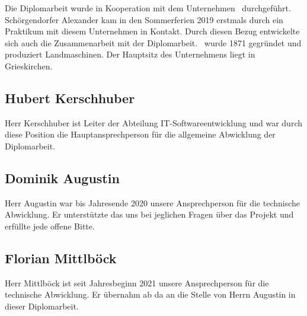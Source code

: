 Die Diplomarbeit wurde in Kooperation mit dem Unternehmen \ThPartnerName \, durchgeführt. Schörgendorfer Alexander kam in den Sommerferien 2019 erstmals durch ein Praktikum mit diesem Unternehmen in Kontakt. Durch diesen Bezug entwickelte sich auch die Zusammenarbeit mit der Diplomarbeit. \ThPartnerName \, wurde 1871 gegründet und produziert Landmaschinen. Der Hauptsitz des Unternehmens liegt in Grieskirchen.

\subsection{Hubert Kerschhuber}

Herr Kerschhuber ist Leiter der Abteilung IT-Softwareentwicklung und war durch diese Position die Hauptansprechperson für die allgemeine Abwicklung der Diplomarbeit.

\subsection{Dominik Augustin}

Herr Augustin war bis Jahresende 2020 unsere Ansprechperson für die technische Abwicklung. Er unterstützte das uns bei jeglichen Fragen über das Projekt und erfüllte jede offene Bitte.

\subsection{Florian Mittlböck}

Herr Mittlböck ist seit Jahresbeginn 2021 unsere Ansprechperson für die technische Abwicklung. Er übernahm ab da an die Stelle von Herrn Augustin in dieser Diplomarbeit.
